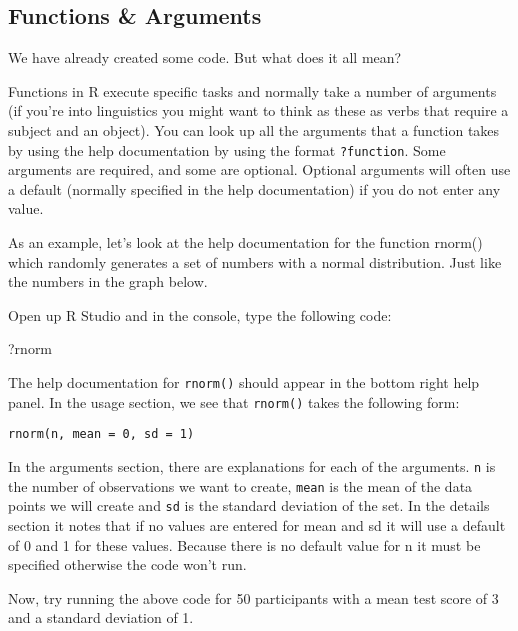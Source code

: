 \documentclass[]{book}
\newenvironment{Shaded}{\begin{snugshade}}{\end{snugshade}}
\newcommand{\NormalTok}[1]{#1}
\begin{document}
\hypertarget{functions-arguments}{%
\subsection{Functions \& Arguments}\label{functions-arguments}}

We have already created some code. But what does it all mean?

Functions in R execute specific tasks and normally take a number of arguments (if you're into linguistics you might want to think as these as verbs that require a subject and an object). You can look up all the arguments that a function takes by using the help documentation by using the format \texttt{?function}. Some arguments are required, and some are optional. Optional arguments will often use a default (normally specified in the help documentation) if you do not enter any value.

As an example, let's look at the help documentation for the function rnorm() which randomly generates a set of numbers with a normal distribution. Just like the numbers in the graph below.

Open up R Studio and in the console, type the following code:

\begin{Shaded}
\begin{Highlighting}[]
\NormalTok{?rnorm}
\end{Highlighting}
\end{Shaded}

The help documentation for \texttt{rnorm()} should appear in the bottom right help panel. In the usage section, we see that \texttt{rnorm()} takes the following form:

\begin{verbatim}
rnorm(n, mean = 0, sd = 1)
\end{verbatim}

In the arguments section, there are explanations for each of the arguments. \texttt{n} is the number of observations we want to create, \texttt{mean} is the mean of the data points we will create and \texttt{sd} is the standard deviation of the set. In the details section it notes that if no values are entered for mean and sd it will use a default of 0 and 1 for these values. Because there is no default value for n it must be specified otherwise the code won't run.

Now, try running the above code for 50 participants with a mean test score of 3 and a standard deviation of 1.
\end{document}
